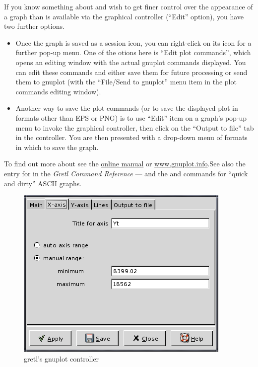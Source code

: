 If you know something about
       and wish to get finer control
      over the appearance of a graph than is available via the
      graphical controller (``Edit'' option), you have two
      further options.
\begin{itemize}
\item Once the graph is saved as a session icon, you
	  can right-click on its icon for a further pop-up menu.  One
	  of the otions here is ``Edit plot commands'',
	  which opens an editing window with the actual gnuplot
	  commands displayed. You can edit these commands and either
	  save them for future processing or send them to gnuplot
	  (with the ``File/Send to gnuplot'' menu item in
	  the plot commands editing window).
\item Another way to save the plot commands (or to
	  save the displayed plot in formats other than EPS or PNG) is
	  to use ``Edit'' item on a graph's pop-up menu to
	  invoke the graphical controller, then click on the
	  ``Output to file'' tab in the controller.  You
	  are then presented with a drop-down menu of formats in which
	  to save the graph.
\end{itemize}

To find out more about 
      see the \href{http://ricardo.ecn.wfu.edu/gnuplot.html}{online
	manual} or \href{http://www.gnuplot.info/}{www.gnuplot.info}.See also the entry for  in 
	the \emph{Gretl Command Reference} --- and the
       and  commands
      for ``quick and dirty'' ASCII graphs.
\begin{figure}[htbp]
\caption{gretl's gnuplot controller}
\label{fig-plot}
\begin{center}
\includegraphics[scale=0.5]{figures/plot_control}
\end{center}
\end{figure}


